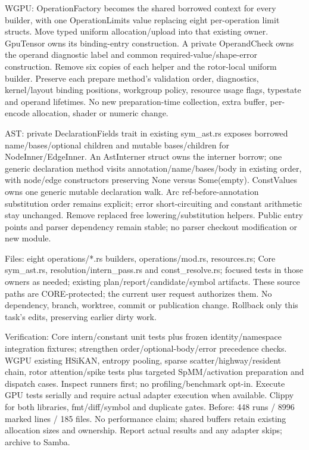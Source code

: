 \documentclass[11pt,a4paper]{article}
\begin{document}
WGPU: OperationFactory becomes the shared borrowed context for every builder,
with one OperationLimits value replacing eight per-operation limit structs.
Move typed uniform allocation/upload into that existing owner. GpuTensor owns
its binding-entry construction. A private OperandCheck owns the operand diagnostic
label and common required-value/shape-error construction. Remove six copies of
each helper and the rotor-local uniform builder. Preserve each prepare method's
validation order, diagnostics, kernel/layout binding positions, workgroup policy,
resource usage flags, typestate and operand lifetimes. No new preparation-time
collection, extra buffer, per-encode allocation, shader or numeric change.

AST: private DeclarationFields trait in existing sym\_ast.rs exposes borrowed
name/bases/optional children and mutable bases/children for NodeInner/EdgeInner.
An AstInterner struct owns the interner borrow; one generic declaration method
visits annotation/name/bases/body in existing order, with node/edge constructors
preserving None versus Some(empty). ConstValues owns one generic mutable
declaration walk. Arc ref-before-annotation substitution order remains explicit;
error short-circuiting and constant arithmetic stay unchanged. Remove replaced
free lowering/substitution helpers. Public entry points and parser dependency
remain stable; no parser checkout modification or new module.

Files: eight operations/*.rs builders, operations/mod.rs, resources.rs;
Core sym\_ast.rs, resolution/intern\_pass.rs and const\_resolve.rs; focused tests
in those owners as needed; existing plan/report/candidate/symbol artifacts.
These source paths are CORE-protected; the current user request authorizes them.
No dependency, branch, worktree, commit or publication change. Rollback only this
task's edits, preserving earlier dirty work.

Verification: Core intern/constant unit tests plus frozen identity/namespace
integration fixtures; strengthen order/optional-body/error precedence checks.
WGPU existing HSiKAN, entropy pooling, sparse scatter/highway/resident chain,
rotor attention/spike tests plus targeted SpMM/activation preparation and dispatch
cases. Inspect runners first; no profiling/benchmark opt-in. Execute GPU tests
serially and require actual adapter execution when available. Clippy for both
libraries, fmt/diff/symbol and duplicate gates. Before: 448 runs / 8996 marked
lines / 185 files. No performance claim; shared buffers retain existing allocation
sizes and ownership. Report actual results and any adapter skips; archive to Samba.
\end{document}
